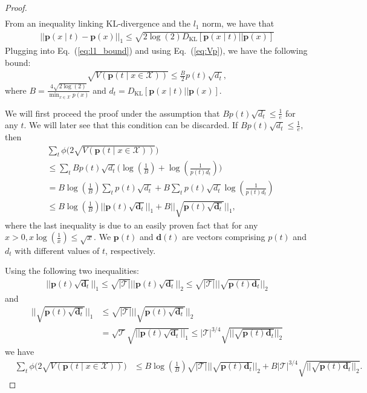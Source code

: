 \documentclass{article} \usepackage{iclr2021_conference,times}
\theoremstyle{definition}
\theoremstyle{remark}
\newcommand{\modified}[1]{{\color{black}{#1}}}
\begin{document}
\begin{proof}
\begin{align}
\end{align}
From an inequality linking KL-divergence and the $l_1$ norm, we have that 
\begin{align}
    ||  {\mathbf{p}(x \mid t) - \mathbf{p}(x)} ||_1  \le \sqrt{2 \log(2) D_{\text{KL}}[ {\mathbf{p}(x \mid t) || \mathbf{p}(x)}] } \label{eq:l1_bound2}
\end{align}
Plugging \modified{Eq.~(\ref{eq:l1_bound2})} into Eq.~(\ref{eq:l1_bound}) and using Eq.~(\ref{eq:Vp}), we have the following bound: 
\begin{align}
    \sqrt{V(\mathbf{p}(t \mid x \in \mathcal{X}))} \le \frac{B}{2} p(t) \sqrt{d_t},
\end{align}
where $B =\frac{4 \sqrt{2\log(2)}}{\min_{x \in \mathcal{X}}p(x)}$ and $d_t = D_{\text{KL}}[ {\mathbf{p}(x \mid t) || \mathbf{p}(x)}].$

We will first proceed the proof under the assumption that $Bp(t) \sqrt{d_t} \le \frac{1}{e}$ for any $t$. We will later see that this condition can be discarded. If $Bp(t) \sqrt{d_t} \le \frac{1}{e},$ then
\begin{align}
     &\sum_t \phi \big( 2\sqrt{V(\mathbf{p}(t \mid x \in \mathcal{X}))} \big)  \\ &\le \sum_t Bp(t) \sqrt{d_t} \big( \log(\frac{1}{B}) + \log(\frac{1}{p(t)d_t}) \big) \\
     &= B \log(\frac{1}{B}) \sum_t p(t) \sqrt{d_t} + B \sum_t p(t) \sqrt{d_t} \log(\frac{1}{p(t)d_t}) \\
     &\le B \log(\frac{1}{B}) ||\mathbf{p}(t) \sqrt{\mathbf{d}_t}||_1 + B ||\sqrt{\mathbf{p}(t)\sqrt{\mathbf{d}_t}}||_1,
\end{align}
where the last inequality is due to an easily proven fact that for any $ x > 0, x\log(\frac{1}{x}) \le \sqrt{x}$. We $\mathbf{p}(t)$ and $\mathbf{d}(t)$ are vectors comprising $p(t)$ and $d_t$ with different values of $t$, respectively.

Using the following two inequalities:
\begin{align}
    ||\mathbf{p}(t) \sqrt{\mathbf{d}_t}||_1 \le \sqrt{|\mathcal{T}|} ||\mathbf{p}(t) \sqrt{\mathbf{d}_t}||_2 \le \sqrt{|\mathcal{T}|} || \sqrt{\mathbf{p}(t) {\mathbf{d}_t}}||_2
\end{align}
and
\begin{align}
    ||\sqrt{\mathbf{p}(t)\sqrt{\mathbf{d}_t}}||_1 &\le \sqrt{|\mathcal{T}|} ||\sqrt{\mathbf{p}(t)\sqrt{\mathbf{d}_t}}||_2 \\
    &= \sqrt{\mathcal{T}}\sqrt{||\mathbf{p}(t)\sqrt{\mathbf{d}_t}||_1} \le |\mathcal{T}|^{3/4}\sqrt{||\sqrt{\mathbf{p}(t) {\mathbf{d}_t}}||_2}
\end{align}
we have 
\begin{align}
     &\sum_t \phi \big( 2\sqrt{V(\mathbf{p}(t \mid x \in \mathcal{X}))} \big)
     &\le B\log(\frac{1}{B}) \sqrt{|\mathcal{T}|} || \sqrt{\mathbf{p}(t) {\mathbf{d}_t}}||_2 + B |\mathcal{T}|^{3/4}\sqrt{||\sqrt{\mathbf{p}(t) {\mathbf{d}_t}}||_2}.
\end{align}


\end{proof}
\end{document}

